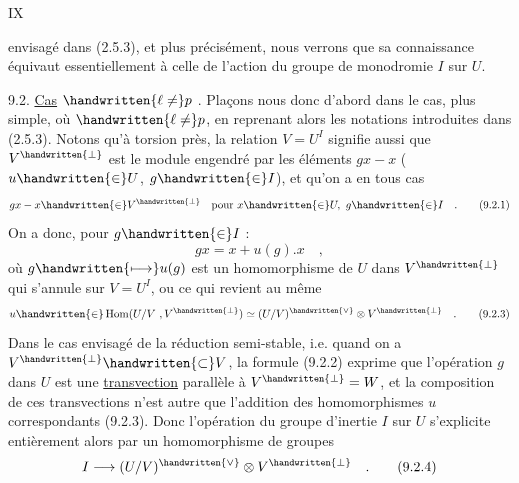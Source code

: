 \hfill IX

envisagé dans (2.5.3), et plus précisément, nous verrons que sa connaissance équivaut essentiellement à celle de l'action du groupe de monodromie $I$ sur $U$.

9.2. \uline{Cas} $\handwritten{\ell\ne}p$ . Plaçons nous donc d'abord dans le cas, plus simple, où $\handwritten{\ell\ne}p$, en reprenant alors les notations introduites dans (2.5.3). Notons qu'à torsion près, la relation $V=U^{I}$ signifie aussi que $V^{\handwritten{\perp}}$ est le module engendré par les éléments $gx-x$ ($u\handwritten{\in}U$, $g\handwritten{\in}I$), et qu'on a en tous cas
\[
gx-x\handwritten{\in}V^{\handwritten{\perp}}\quad\text{pour }x\handwritten{\in}U,\ g\handwritten{\in}I\quad .\tag*{(9.2.1)}
\]
On a donc, pour $g\handwritten{\in}I$ :
\[
gx=x+u(g).x\quad ,\tag*{(9.2.2)}
\]
où $g\handwritten{\longmapsto}u(g)$ est un homomorphisme de $U$ dans $V^{\handwritten{\perp}}$ qui s'annule sur $V=U^I$, ou ce qui revient au même
\[
u\handwritten{\in}\operatorname{Hom}(U/V\ ,V^{\handwritten{\perp}})\simeq (U/V)^{\handwritten{\vee}}\otimes V^{\handwritten{\perp}}\quad .\tag*{(9.2.3)}
\]
Dans le cas envisagé de la réduction semi-stable, i.e. quand on a $V^{\handwritten{\perp}}\handwritten{\subset} V$, la formule (9.2.2) exprime que l'opération $g$ dans $U$ est une \uline{transvection} parallèle à $V^{\handwritten{\perp}}=W$, et la composition de ces transvections n'est autre que l'addition des homomorphismes $u$ correspondants (9.2.3). Donc l'opération du groupe d'inertie $I$ sur $U$ s'explicite entièrement alors par un homomorphisme de groupes
\[
I\longrightarrow (U/V)^{\handwritten{\vee}}\otimes V^{\handwritten{\perp}}\quad .\tag*{(9.2.4)}
\]
\margin{\handwritten{$\unsure{\longleftarrow}$}}
